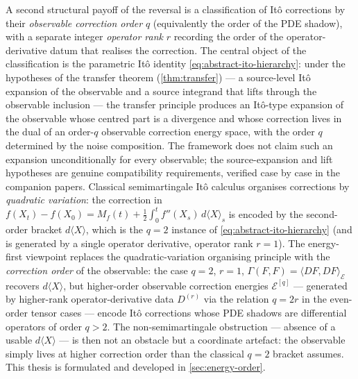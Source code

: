 \documentclass[11pt,reqno]{amsart}
\theoremstyle{plain}
\theoremstyle{definition}
\theoremstyle{remark}
\newcommand{\Energy}{\mathcal{E}}
\newcommand{\Carre}{\Gamma}
\begin{document}
A second structural payoff of the reversal is a classification of
It\^o corrections by their \emph{observable correction order} $q$
(equivalently the order of the PDE shadow), with a separate integer
\emph{operator rank} $r$ recording the order of the operator-derivative
datum that realises the correction. The central object of the
classification is the parametric It\^o identity
\eqref{eq:abstract-ito-hierarchy}: under the hypotheses of the
transfer theorem (\cref{thm:transfer}) --- a source-level It\^o
expansion of the observable and a source integrand that lifts through
the observable inclusion --- the transfer principle produces an
It\^o-type expansion of the observable whose centred part is a
divergence and whose correction lives in the dual of an order-$q$
observable correction energy space, with the order $q$ determined by
the noise composition. The framework does not claim such an expansion
unconditionally for every observable; the source-expansion and lift
hypotheses are genuine compatibility requirements, verified case by
case in the companion papers. Classical semimartingale It\^o
calculus organises corrections by \emph{quadratic variation}: the
correction in
$f(X_{t})-f(X_{0})=M_{f}(t)+\tfrac{1}{2}\!\int_{0}^{t}f''(X_s)\,
d\langle X\rangle_{s}$ is encoded by the second-order bracket
$d\langle X\rangle$, which is the $q=2$ instance of
\eqref{eq:abstract-ito-hierarchy} (and is generated by a single
operator derivative, operator rank $r=1$). The energy-first viewpoint
replaces the quadratic-variation organising principle with the
\emph{correction order} of the observable: the case $q=2$, $r=1$,
$\Carre(F,F)=\langle DF,DF\rangle_\Energy$ recovers
$d\langle X\rangle$, but higher-order observable correction energies
$\Energy^{[q]}$ --- generated by higher-rank operator-derivative data
$D^{(r)}$ via the relation $q=2r$ in the even-order tensor cases ---
encode It\^o corrections whose PDE shadows are differential operators
of order $q>2$. The non-semimartingale obstruction --- absence of a
usable $d\langle X\rangle$ --- is then not an obstacle but a coordinate
artefact: the observable simply lives at higher correction order than
the classical $q=2$ bracket assumes. This thesis is formulated and
developed in \cref{sec:energy-order}.
\end{document}

